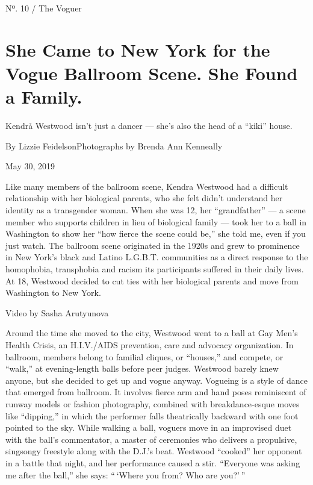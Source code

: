Nº. 10 / The Voguer

\hypertarget{she-came-to-new-york-for-the-vogue-ballroom-scene-she-found-a-family-1}{%
\section{She Came to New York for the Vogue Ballroom Scene. She Found a
Family.}\label{she-came-to-new-york-for-the-vogue-ballroom-scene-she-found-a-family-1}}

Kendrå Westwood isn't just a dancer --- she's also the head of a
``kiki'' house.

By Lizzie FeidelsonPhotographs by Brenda Ann Kenneally

May 30, 2019

Like many members of the ballroom scene, Kendra Westwood had a difficult
relationship with her biological parents, who she felt didn't understand
her identity as a transgender woman. When she was 12, her
``grandfather'' --- a scene member who supports children in lieu of
biological family --- took her to a ball in Washington to show her ``how
fierce the scene could be,'' she told me, even if you just watch. The
ballroom scene originated in the 1920s and grew to prominence in New
York's black and Latino L.G.B.T. communities as a direct response to the
homophobia, transphobia and racism its participants suffered in their
daily lives. At 18, Westwood decided to cut ties with her biological
parents and move from Washington to New York.

 Video by Sasha Arutyunova

Around the time she moved to the city, Westwood went to a ball at Gay
Men's Health Crisis, an H.I.V./AIDS prevention, care and advocacy
organization. In ballroom, members belong to familial cliques, or
``houses,'' and compete, or ``walk,'' at evening-length balls before
peer judges. Westwood barely knew anyone, but she decided to get up and
vogue anyway. Vogueing is a style of dance that emerged from ballroom.
It involves fierce arm and hand poses reminiscent of runway models or
fashion photography, combined with breakdance-esque moves like
``dipping,'' in which the performer falls theatrically backward with one
foot pointed to the sky. While walking a ball, voguers move in an
improvised duet with the ball's commentator, a master of ceremonies who
delivers a propulsive, singsongy freestyle along with the D.J.'s beat.
Westwood ``cooked'' her opponent in a battle that night, and her
performance caused a stir. ``Everyone was asking me after the ball,''
she says: `` `Where you from? Who are you?' ''

